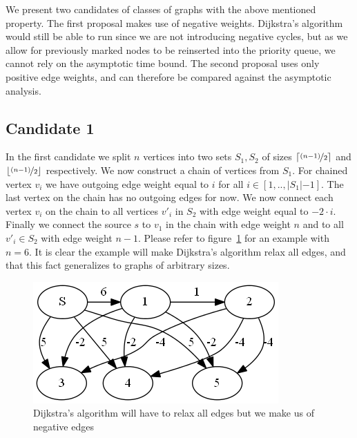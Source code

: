 \documentclass[a4paper,oneside,article,11pt]{memoir}
\begin{document}
We present two candidates of classes of graphs with the above mentioned property. The first proposal makes use of negative weights. Dijkstra's algorithm would still be able to run since we are not introducing negative cycles, but as we allow for previously marked nodes to be reinserted into the priority queue, we cannot rely on the asymptotic time bound. The second proposal uses only positive edge weights, and can therefore be compared against the asymptotic analysis.

\subsection{Candidate 1}
In the first candidate we split $n$ vertices into two sets $S_1, S_2$ of sizes $\lceil \nicefrac{(n-1)}{2} \rceil$ and $\lfloor \nicefrac{(n-1)}{2} \rfloor$ respectively. We now construct a chain of vertices from $S_1$. For chained vertex $v_i$ we have outgoing edge weight equal to $i$ for all $i \in [1, .. ,\lvert S_1 \lvert - 1]$. The last vertex on the chain has no outgoing edges for now. We now connect each vertex $v_i$ on the chain to all vertices ${v'}_i$ in $S_2$ with edge weight equal to $-2 \cdot i$. Finally we connect the source $s$ to $v_1$ in the chain with edge weight $n$ and to all ${v'}_i \in S_2$ with edge weight $n-1$. Please refer to figure~\ref{figure:graph_neg_weights} for an example with $n=6$. It is clear the example will make Dijkstra's algorithm relax all edges, and that this fact generalizes to graphs of arbitrary sizes.

\begin{figure}[H]
\centering
\includegraphics[scale=0.8]{../figures/graph_neg_weights.png}
\caption{Dijkstra's algorithm will have to relax all edges but we make us of negative edges}
\label{figure:graph_neg_weights}
\end{figure}
\end{document}
